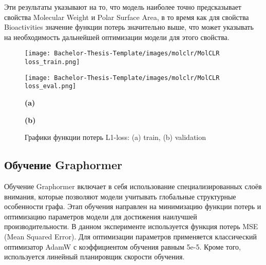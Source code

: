 Эти результаты указывают на то, что модель наиболее точно предсказывает свойства Molecular Weight и Polar Surface Area, в то время как для свойства Bioactivities значение функции потерь значительно выше, что может указывать на необходимость дальнейшей оптимизации модели для этого свойства.

\begin{figure}[h]
    \begin{minipage}{0.5\textwidth}
        \centering
        \texttt{[image: Bachelor-Thesis-Template/images/molclr/MolCLR loss\_train.png]}
    \end{minipage}%
    \begin{minipage}{0.5\textwidth}
        \centering
        \texttt{[image: Bachelor-Thesis-Template/images/molclr/MolCLR loss\_eval.png]}
    \end{minipage}%

    \newline
    \begin{minipage}{0.5\textwidth}
      \centering
    \textbf{(a)}
    \end{minipage}%
    \begin{minipage}{0.5\textwidth}
    \centering
    \textbf{(b)}
    \end{minipage}%
    
    \caption{\small Графики функции потерь L1-loss: (a) train, (b) validation}
    \label{fig:molclr_loss}
\end{figure}

\subsection{Обучение Graphormer}
Обучение Graphormer включает в себя использование специализированных слоёв внимания, которые позволяют модели учитывать глобальные структурные особенности графа. Этап обучения направлен на минимизацию функции потерь и оптимизацию параметров модели для достижения наилучшей производительности. В данном эксперименте используется функция потерь MSE (Mean Squared Error). Для оптимизации параметров применяется классический оптимизатор AdamW с коэффициентом обучения равным 5e-5. Кроме того, используется линейный планировщик скорости обучения.


